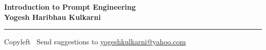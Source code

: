 
\graphicspath{{images/}}

\footnotesize


\begin{center}
\Large{\textbf{Introduction to Prompt Engineering\\ Yogesh Haribhau Kulkarni}}  
\end{center}

\begin{multicols}{2}

%
\end{multicols}

\rule{\linewidth}{0.25pt}
\scriptsize
Copyleft \textcopyleft\  Send suggestions to 
\href{http://www.yogeshkulkarni.com}{yogeshkulkarni@yahoo.com}



